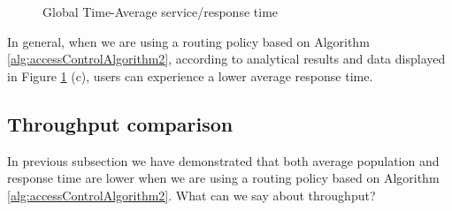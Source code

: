 \documentclass[10pt,a4paper]{article}
\begin{document}
\begin{figure}[h!]
    \centering
    \caption{Global Time-Average service/response time}%
    \label{fig:Class1Class2ServiceTimeComparasion}
\end{figure}

In general, when we are using a routing policy based on Algorithm \ref{alg:accessControlAlgorithm2}, according to analytical results and data displayed in Figure \ref{fig:Class1Class2ServiceTimeComparasion} (c), users can experience a lower average response time.

\subsection{Throughput comparison}

In previous subsection we have demonstrated that both average population and response time are lower when we are using a routing policy based on Algorithm \ref{alg:accessControlAlgorithm2}. What can we say about throughput? 
\end{document}

